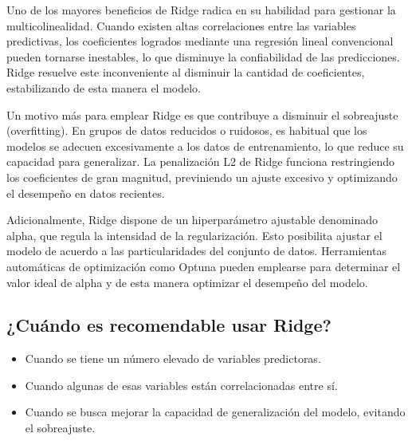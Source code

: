 \documentclass{article}
\begin{document}
 Uno de los mayores beneficios de Ridge radica en su habilidad para gestionar la multicolinealidad.  Cuando existen altas correlaciones entre las variables predictivas, los coeficientes logrados mediante una regresión lineal convencional pueden tornarse inestables, lo que disminuye la confiabilidad de las predicciones.  Ridge resuelve este inconveniente al disminuir la cantidad de coeficientes, estabilizando de esta manera el modelo.
 
Un motivo más para emplear Ridge es que contribuye a disminuir el sobreajuste (overfitting).  En grupos de datos reducidos o ruidosos, es habitual que los modelos se adecuen excesivamente a los datos de entrenamiento, lo que reduce su capacidad para generalizar.  La penalización L2 de Ridge funciona restringiendo los coeficientes de gran magnitud, previniendo un ajuste excesivo y optimizando el desempeño en datos recientes.

 Adicionalmente, Ridge dispone de un hiperparámetro ajustable denominado alpha, que regula la intensidad de la regularización.  Esto posibilita ajustar el modelo de acuerdo a las particularidades del conjunto de datos.  Herramientas automáticas de optimización como Optuna pueden emplearse para determinar el valor ideal de alpha y de esta manera optimizar el desempeño del modelo.

\subsection{¿Cuándo es recomendable usar Ridge?}
\begin{itemize}
    \item Cuando se tiene un número elevado de variables predictoras.
    \item Cuando algunas de esas variables están correlacionadas entre sí.
    \item Cuando se busca mejorar la capacidad de generalización del modelo, evitando el sobreajuste.
\end{itemize}
\end{document}
